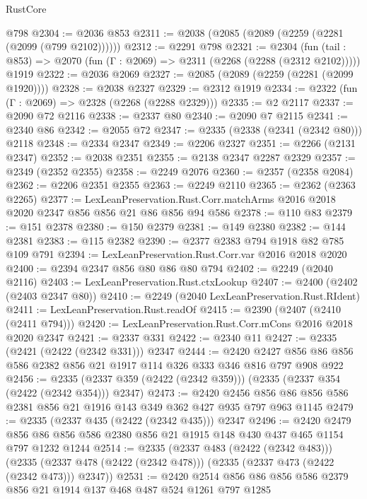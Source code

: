 \begin{lexlean}{RustCore}
\begin{coremodule}
    @798
@2304 := @2036 @853
@2311 := @2038 (@2085 (@2089 (@2259 (@2281 (@2099 (@799 @2102))))))
@2312 := @2291 @798
@2321 := @2304
    (fun (tail : @853) => @2070 (fun (Γ : @2069) => @2311 (@2268 (@2288 (@2312 @2102)))))
    @1919
@2322 := @2036 @2069
@2327 := @2085 (@2089 (@2259 (@2281 (@2099 @1920))))
@2328 := @2038 @2327
@2329 := @2312 @1919
@2334 := @2322 (fun (Γ : @2069) => @2328 (@2268 (@2288 @2329)))
@2335 := @2 @2117
@2337 := @2090 @72 @2116
@2338 := @2337 @80
@2340 := @2090 @7 @2115
@2341 := @2340 @86
@2342 := @2055 @72
@2347 := @2335 (@2338 (@2341 (@2342 @80))) @2118
@2348 := @2334 @2347
@2349 := @2206 @2327
@2351 := @2266 (@2131 @2347)
@2352 := @2038 @2351
@2355 := @2138 @2347 @2287 @2329
@2357 := @2349 (@2352 @2355)
@2358 := @2249 @2076
@2360 := @2357 (@2358 @2084)
@2362 := @2206 @2351 @2355
@2363 := @2249 @2110
@2365 := @2362 (@2363 @2265)
@2377 := LexLeanPreservation.Rust.Corr.matchArms
    @2016
    @2018
    @2020
    @2347
    @856
    @856
    @21
    @86
    @856
    @94
    @586
@2378 := @110 @83
@2379 := @151 @2378
@2380 := @150 @2379
@2381 := @149 @2380
@2382 := @144 @2381
@2383 := @115 @2382
@2390 := @2377 @2383 @794 @1918 @82 @785 @109 @791
@2394 := LexLeanPreservation.Rust.Corr.var @2016 @2018 @2020
@2400 := @2394 @2347 @856 @80 @86 @80 @794
@2402 := @2249 (@2040 @2116)
@2403 := LexLeanPreservation.Rust.ctxLookup
@2407 := @2400 (@2402 (@2403 @2347 @80))
@2410 := @2249 (@2040 LexLeanPreservation.Rust.RIdent)
@2411 := LexLeanPreservation.Rust.readOf
@2415 := @2390 (@2407 (@2410 (@2411 @794)))
@2420 := LexLeanPreservation.Rust.Corr.mCons @2016 @2018 @2020 @2347
@2421 := @2337 @331
@2422 := @2340 @11
@2427 := @2335 (@2421 (@2422 (@2342 @331))) @2347
@2444 := @2420 @2427 @856 @86 @856 @586 @2382 @856 @21 @1917 @114 @326 @333 @346 @816 @797 @908 @922
@2456 := @2335 (@2337 @359 (@2422 (@2342 @359))) (@2335 (@2337 @354 (@2422 (@2342 @354))) @2347)
@2473 := @2420
    @2456
    @856
    @86
    @856
    @586
    @2381
    @856
    @21
    @1916
    @143
    @349
    @362
    @427
    @935
    @797
    @963
    @1145
@2479 := @2335 (@2337 @435 (@2422 (@2342 @435))) @2347
@2496 := @2420
    @2479
    @856
    @86
    @856
    @586
    @2380
    @856
    @21
    @1915
    @148
    @430
    @437
    @465
    @1154
    @797
    @1232
    @1244
@2514 := @2335
    (@2337 @483 (@2422 (@2342 @483)))
    (@2335 (@2337 @478 (@2422 (@2342 @478))) (@2335 (@2337 @473 (@2422 (@2342 @473))) @2347))
@2531 := @2420
    @2514
    @856
    @86
    @856
    @586
    @2379
    @856
    @21
    @1914
    @137
    @468
    @487
    @524
    @1261
    @797
    @1285

\end{coremodule}
\end{lexlean}
